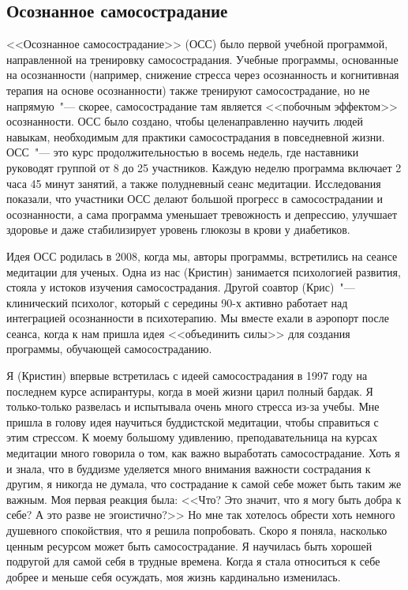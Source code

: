 	
	\subsection*{Осознанное самосострадание}
	
	<<Осознанное самосострадание>> (ОСС) было первой учебной программой, направленной на тренировку самосострадания. Учебные программы, основанные на осознанности (например, снижение стресса через осознанность и когнитивная терапия на основе осознанности) также тренируют самосострадание, но не напрямую~"--- скорее, самосострадание там является <<побочным эффектом>> осознанности. ОСС было создано, чтобы целенаправленно научить людей навыкам, необходимым для практики самосострадания в повседневной жизни. ОСС~"--- это курс продолжительностью в восемь недель, где наставники руководят группой от 8 до 25 участников. Каждую неделю программа включает 2 часа 45 минут занятий, а также полудневный сеанс медитации. Исследования показали, что участники ОСС делают большой прогресс в самосострадании и осознанности, а сама программа уменьшает тревожность и депрессию, улучшает здоровье и даже стабилизирует уровень глюкозы в крови у диабетиков.
	
	Идея ОСС родилась в 2008, когда мы, авторы программы, встретились на сеансе  медитации для ученых. Одна из нас (Кристин) занимается психологией развития, стояла у истоков изучения самосострадания. Другой соавтор (Крис)~"--- клинический психолог, который с середины 90-х активно работает над интеграцией осознанности в психотерапию. Мы вместе ехали в аэропорт после сеанса, когда к нам пришла идея <<объединить силы>> для создания программы, обучающей самосостраданию.
	
	Я (Кристин) впервые встретилась с идеей самосострадания в 1997 году на последнем курсе аспирантуры, когда в моей жизни царил полный бардак. Я только-только развелась и испытывала очень много стресса из-за учебы. Мне пришла в голову идея научиться буддистской медитации, чтобы справиться с этим стрессом. К моему большому удивлению, преподавательница на курсах медитации много говорила о том, как важно выработать самосострадание. Хоть я и знала, что в буддизме уделяется много внимания важности сострадания к другим, я никогда не думала, что сострадание к самой себе может быть таким же важным. Моя первая реакция была: <<Что? Это значит, что я могу быть добра к себе? А это разве не эгоистично?>> Но мне так хотелось обрести хоть немного душевного спокойствия, что я решила попробовать. Скоро я поняла, насколько ценным ресурсом может быть самосострадание. Я научилась быть хорошей подругой для самой себя в трудные времена. Когда я стала относиться к себе добрее и меньше себя осуждать, моя жизнь кардинально изменилась. 
	
